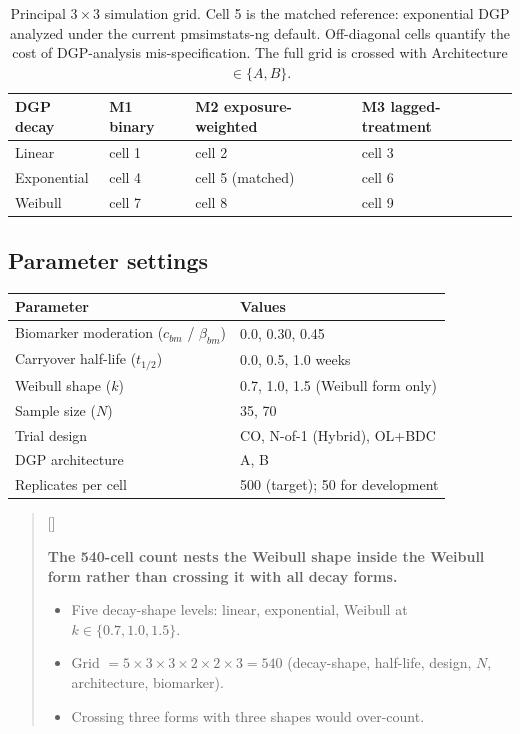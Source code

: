 \documentclass[
  11pt,
]{article}
\newcounter{none} %
\newcounter{pgraph}
\newenvironment{bullets}{%
  \stepcounter{pgraph}%
  \begin{quote}\small\sffamily\color[gray]{0.30}%
  {\normalfont\scriptsize\color[gray]{0.58}[\thepgraph]\enspace}}{%
  \end{quote}}
\begin{document}
\begin{table}

\caption{\label{tab:grid-table}Principal $3 \times 3$ simulation grid. Cell 5 is the
    matched reference: exponential DGP analyzed under the current
    pmsimstats-ng default. Off-diagonal cells quantify the cost of
    DGP-analysis mis-specification. The full grid is crossed with
    Architecture $\in \{A, B\}$.}
\centering
\begin{tabular}[t]{l|l|l|l}
\hline
DGP decay & M1 binary & M2 exposure-weighted & M3 lagged-treatment\\
\hline
Linear & cell 1 & cell 2 & cell 3\\
\hline
Exponential & cell 4 & cell 5 (matched) & cell 6\\
\hline
Weibull & cell 7 & cell 8 & cell 9\\
\hline
\end{tabular}
\end{table}

\subsection{Parameter settings}\label{parameter-settings}

{\def\LTcaptype{none} %
\begin{longtable}[]{@{}ll@{}}
\toprule\noalign{}
Parameter & Values \\
\midrule\noalign{}
\endhead
\bottomrule\noalign{}
\endlastfoot
Biomarker moderation (\(c_{bm}\) / \(\beta_{bm}\)) & 0.0, 0.30, 0.45 \\
Carryover half-life (\(t_{1/2}\)) & 0.0, 0.5, 1.0 weeks \\
Weibull shape (\(k\)) & 0.7, 1.0, 1.5 (Weibull form only) \\
Sample size (\(N\)) & 35, 70 \\
Trial design & CO, N-of-1 (Hybrid), OL+BDC \\
DGP architecture & A, B \\
Replicates per cell & 500 (target); 50 for development \\
\end{longtable}
}

\begin{bullets}

\textbf{The 540-cell count nests the Weibull shape inside the
Weibull form rather than crossing it with all decay forms.}

\begin{itemize}\setlength{\itemsep}{2pt}\setlength{\parskip}{0pt}
\item Five decay-shape levels: linear, exponential, Weibull at
$k \in \{0.7, 1.0, 1.5\}$.
\item Grid $= 5 \times 3 \times 3 \times 2 \times 2 \times 3 = 540$
(decay-shape, half-life, design, $N$, architecture, biomarker).
\item Crossing three forms with three shapes would over-count.
\end{itemize}

\end{bullets}
\end{document}

